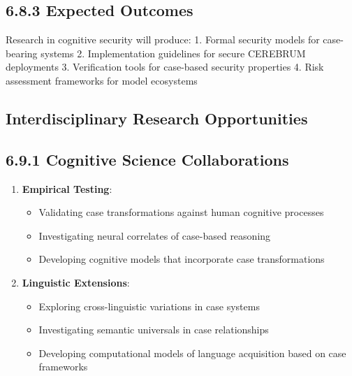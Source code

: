 \documentclass[
  11pt,
  letterpaper,
]{article}
\providecommand{\tightlist}{%
  \setlength{\itemsep}{0pt}\setlength{\parskip}{0pt}}
\begin{document}
\hypertarget{expected-outcomes-1}{%
\subsection{6.8.3 Expected Outcomes}\label{expected-outcomes-1}}

Research in cognitive security will produce: 1. Formal security models
for case-bearing systems 2. Implementation guidelines for secure
CEREBRUM deployments 3. Verification tools for case-based security
properties 4. Risk assessment frameworks for model ecosystems

\hypertarget{interdisciplinary-research-opportunities}{%
\subsection{Interdisciplinary Research
Opportunities}\label{interdisciplinary-research-opportunities}}

\hypertarget{cognitive-science-collaborations}{%
\subsection{6.9.1 Cognitive Science
Collaborations}\label{cognitive-science-collaborations}}

\begin{enumerate}
\def\labelenumi{\arabic{enumi}.}
\tightlist
\item
  \textbf{Empirical Testing}:

  \begin{itemize}
  \tightlist
  \item
    Validating case transformations against human cognitive processes
  \item
    Investigating neural correlates of case-based reasoning
  \item
    Developing cognitive models that incorporate case transformations
  \end{itemize}
\item
  \textbf{Linguistic Extensions}:

  \begin{itemize}
  \tightlist
  \item
    Exploring cross-linguistic variations in case systems
  \item
    Investigating semantic universals in case relationships
  \item
    Developing computational models of language acquisition based on
    case frameworks
  \end{itemize}
\end{enumerate}
\end{document}
